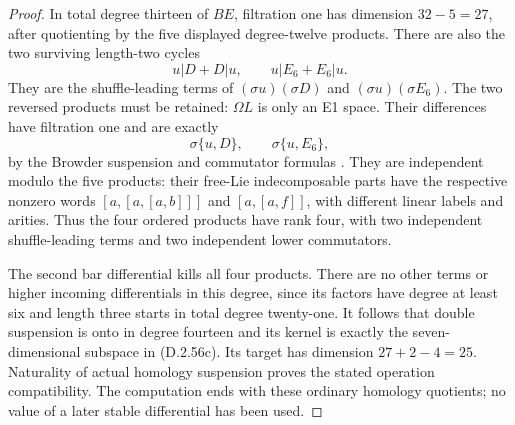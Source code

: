 \begin{proof}
In total degree thirteen of $BE$, filtration one has
dimension $32-5=27$, after quotienting by the five
displayed degree-twelve products.  There are also the
two surviving length-two cycles
\[
 u|D+D|u,\qquad u|E_6+E_6|u.
 \tag{D.2.56k}
\]
They are the shuffle-leading terms of
$(\sigma u)(\sigma D)$ and $(\sigma u)(\sigma E_6)$.
The two reversed products must be retained: $\Omega L$
is only an E1 space.  Their differences have filtration
one and are exactly
\[
 \sigma\{u,D\},\qquad\sigma\{u,E_6\},
 \tag{D.2.56l}
\]
by the Browder suspension and commutator formulas
\cite[Chapter III, Theorem 1.4(3) and Theorem 1.2(2)]
{I_CohenLadaMay1976}.  They are independent modulo the
five products: their free-Lie indecomposable parts have
the respective nonzero words $[a,[a,[a,b]]]$ and
$[a,[a,f]]$, with different linear labels and arities.
Thus the four ordered products have rank four, with
two independent shuffle-leading terms and two independent
lower commutators.

The second bar differential kills all four products.
There are no other terms or higher incoming differentials
in this degree, since its factors have degree at least six
and length three starts in total degree twenty-one.
It follows that double suspension is onto in degree
fourteen and its kernel is exactly the seven-dimensional
subspace in \textup{(D.2.56c)}.  Its target has dimension
$27+2-4=25$.  Naturality of actual homology suspension
proves the stated operation compatibility.  The computation
ends with these ordinary homology quotients; no value of
a later stable differential has been used.
\end{proof}
